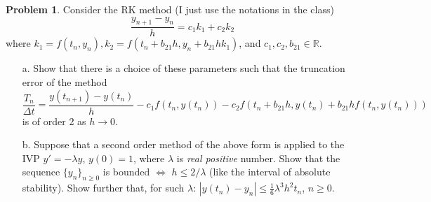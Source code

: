 \documentclass[a4paper, 10pt]{article}
\theoremstyle{definition}
\newtheorem{problem}{Problem}
\theoremstyle{hSol}
\begin{document}
\begin{problem} Consider the RK method (I just use the notations in the class)
$$
\frac{y_{n+1}-y_n}{h} = c_1k_1 + c_2 k_2
$$
where $k_1= f(t_n, y_n), k_2 = f(t_n+b_{21}h, y_n + b_{21}h k_1)$, and $c_1, c_2, b_{21} \in \mathbb{R}$. 
\begin{itemize}
  \item[a.] Show that there is a choice of these parameters such that the truncation error of the method
  $$
  \frac{T_n}{\Delta t} = \frac{y(t_{n+1})-y(t_n)}{h} - c_1f(t_n, y(t_n)) - c_2 f(t_n+b_{21}h, y(t_n) + b_{21}h f(t_n, y(t_n)))
  $$
  is of order 2 as $h \to 0$.
  \item[b.] Suppose that a second order method of the above form is applied to the IVP $y'=-\lambda y$, $y(0)=1$, where $\lambda$ is \emph{real positive} number. Show that the sequence $\{y_n\}_{n\geq 0}$ is bounded $\iff$ $h \leq 2/\lambda$ (like the interval of absolute stability). Show further that, for such $\lambda$: $|y(t_n) - y_n|\leq \frac{1}{6}\lambda^3 h^2 t_n$, $n\geq 0$.
\end{itemize}
\end{problem}
\end{document}
